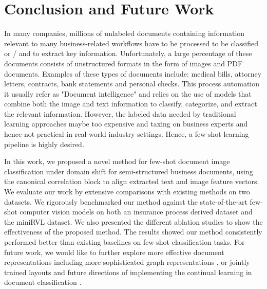 \section{Conclusion and Future Work}
In many companies, millions of unlabeled documents containing information relevant to many business-related workflows have to be processed to be classified or / and to extract key information. Unfortunately, a large percentage of these documents consists of unstructured formats in the form of images and PDF documents. Examples of these types of documents include: medical bills, attorney letters, contracts, bank statements and personal checks. This process automation it usually refer as "Document intelligence" and relies on the use of models that combine both the image and text information to classify, categorize, and extract the relevant information. However, the labeled data needed by traditional learning approaches maybe too expensive and taxing on business experts and hence not practical in real-world industry settings. Hence, a few-shot learning pipeline is highly desired.

In this work, we proposed a novel method for few-shot document image classification under domain shift for semi-structured business documents, using the canonical correlation block to align extracted text and image feature vectors. We evaluate our work by extensive comparisons with existing  methods on two datasets.
We rigorously benchmarked our method against the state-of-the-art few-shot computer vision models on both an insurance process derived dataset and the miniRVL dataset. We also presented the different ablation studies to show the effectiveness of the proposed method. The results showed our method consistently performed better than existing baselines on few-shot classification tasks. For future work, we would like to further explore more effective document representations including more sophisticated graph representations , or jointly trained layouts \cite{mandivarapu2021efficient} and future directions of implementing the continual learning in document classification \cite{10.3389/frai.2020.00019,blake1,jay2,DJay}.


